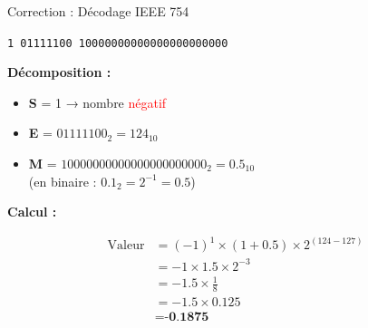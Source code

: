 \documentclass[aspectratio=1610]{beamer}
\begin{document}
\begin{frame}{Correction : Décodage IEEE 754}

  \texttt{1 01111100 10000000000000000000000}

  \vspace{0.3cm}

  \textbf{Décomposition :}

  \begin{itemize}
    \item \textbf{S} = 1 → nombre \textcolor{red}{négatif}
    \item \textbf{E} = $01111100_2 = 124_{10}$
    \item \textbf{M} = $10000000000000000000000_2 = 0.5_{10}$ \\
          (en binaire : $0.1_2 = 2^{-1} = 0.5$)
  \end{itemize}

  \vspace{0.3cm}

  \textbf{Calcul :}

  \begin{align*}
    \text{Valeur} &= (-1)^1 \times (1 + 0.5) \times 2^{(124 - 127)} \\
                  &= -1 \times 1.5 \times 2^{-3} \\
                  &= -1.5 \times \frac{1}{8} \\
                  &= -1.5 \times 0.125 \\
                  &= \textbf{-0.1875}
  \end{align*}

\end{frame}
\end{document}
